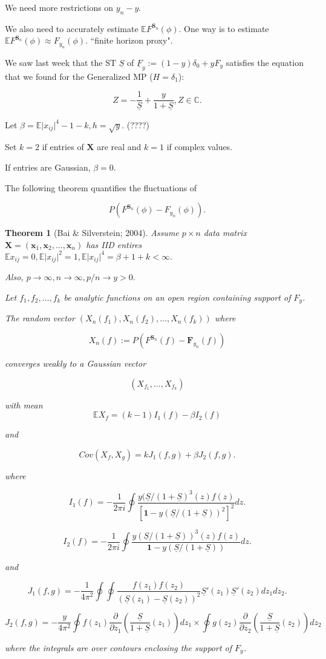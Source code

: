 \documentclass[twoside]{article}
\newcounter{lecnum}
\newtheorem{theorem}{Theorem}[lecnum]
\begin{document}
We need more restrictions on $y_n-y$.

We also need to accurately estimate $\mathbb{E}F^{\mathbf{S}_n}(\phi)$. One way is to estimate $\mathbb{E}F^{\mathbf{S}_n}(\phi)\approx F_{y_n}(\phi)$. ``finite horizon proxy".

We saw last week that the ST $\underline{S}$ of $\underline{F}_y:=(1-y)\delta_0+yF_y$ satisfies the equation that we found for the Generalized MP ($H=\delta_1$):

$$Z=-\frac{1}{\underline{S}}+\frac{y}{1+\underline{S}}, Z\in\mathbb{C}.$$

Let $\beta=\mathbb{E}\lvert x_{ij}\rvert^4-1-k, h =\sqrt{y}.$ (????)

Set $k=2$ if entries of $\mathbf{X}$ are real and $k=1$ if complex values.

If entries are Gaussian, $\beta=0$.

The following theorem quantifies the fluctuations of 

$$P(F^{\mathbf{S}_n}(\phi)-F_{y_n}(\phi)).$$

\begin{theorem}
	[Bai \& Silverstein; 2004] Assume $p\times n$ data matrix $\mathbf{X}=(\mathbf{x}_1,\mathbf{x}_2,\dots,\mathbf{x}_n)$ has IID entires $\mathbb{E}x_{ij}=0, \mathbb{E}\lvert x_{ij}\rvert ^2=1, \mathbb{E}\lvert x_{ij}\rvert ^4 =\beta+1+k<\infty.$
	
	Also, $p\to\infty,n\to\infty,p/n\to y>0.$
	
	Let $f_1,f_2,\dots, f_k$ be analytic functions on an open region containing support of $F_y$.
	
	The random vector $(X_n(f_1),X_n(f_2),\dots, X_n(f_k))$ where 
	
	$$X_n(f):=P(F^{\mathbf{S}_n}(f)-\mathbf{F}_{y_n}(f))$$
	
	converges weakly to a Gaussian vector
	
	$$(X_{f_1},\dots, X_{f_k})$$
	
	with mean $$\mathbb{E}X_f=(k-1)I_1(f)-\beta I_2(f)$$
	
	and
	
	$$Cov(X_{f}, X_g)=kJ_1(f,g)+\beta J_2(f,g).$$
	
	where
	
	$$I_1(f)=-\frac{1}{2\pi i}\oint\frac{y(\underline{S}/(1+\underline{S})^3(z)f(z)}{[\mathbf{1}-y(\underline{S}/(1+\underline{S}))^2]^2}dz.$$
	
	$$I_2(f)=-\frac{1}{2\pi i}\oint \frac{y(\underline{S}/(1+\underline{S}))^3(z)f(z)}{\mathbf{1}-y(\underline{S}/(1+\underline{S}))}dz.$$
	
	and
	
	$$J_1(f,g)=-\frac{1}{4\pi^2}\oint\oint\frac{f(z_1)f(z_2)}{(\underline{S}(z_1)-\underline{S}(z_2))^2}\underline{S}'(z_1)\underline{S}'(z_2)dz_1dz_2.$$
	
	$$J_2(f,g)=-\frac{y}{4\pi^2}\oint f(z_1)\frac{\partial}{\partial z_1}\left(\frac{\underline{S}}{1+\underline{S}}(z_1)\right)dz_1\times \oint g(z_2)\frac{\partial}{\partial z_2}\left(\frac{\underline{S}}{1+\underline{S}}(z_2)\right)dz_2$$
	
	where the integrals are over contours enclosing the support of $F_y$.
\end{theorem}
\end{document}
